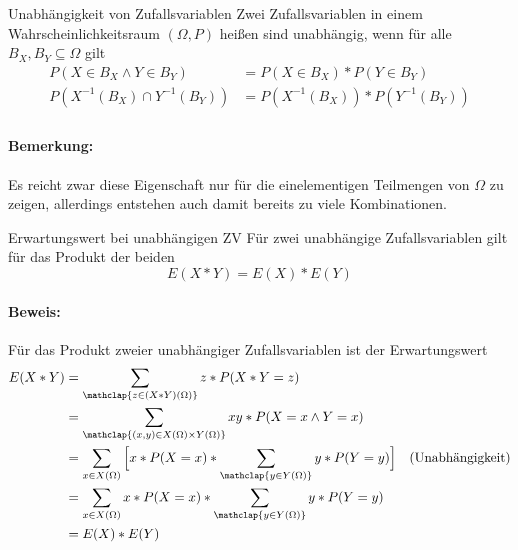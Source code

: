 \begin{definition}{Unabhängigkeit von Zufallsvariablen}
	Zwei Zufallsvariablen in einem Wahrscheinlichkeitsraum $(\Omega,P)$ heißen sind unabhängig, wenn 
	für alle $B_X,B_Y\subseteq \Omega$ gilt
	\begin{align*}
		P(X\in B_X\wedge Y\in B_Y)&=P(X\in B_X)*P(Y\in B_Y)\\
		P(X^{-1}(B_X)\cap Y^{-1}(B_Y))&=P(X^{-1}(B_X))*P(Y^{-1}(B_Y))\\
	\end{align*}
\end{definition}
\paragraph{Bemerkung:}
Es reicht zwar diese Eigenschaft nur für die einelementigen Teilmengen von $\Omega$ zu zeigen, allerdings entstehen auch damit bereits zu viele Kombinationen.


\begin{satz}{Erwartungswert bei unabhängigen ZV}
	Für zwei unabhängige Zufallsvariablen gilt für das Produkt der beiden
	\begin{equation*}
		E(X*Y)=E(X)*E(Y)
	\end{equation*}
\end{satz}
\paragraph{Beweis:}
Für das Produkt zweier unabhängiger Zufallsvariablen ist der Erwartungswert
\begin{align*}
	E(X*Y)&=\sum_{\mathclap{z\in(X*Y)(\Omega)}}z*P(X*Y=z)\\
	&=\sum_{\mathclap{(x,y)\in X(\Omega)\times Y(\Omega)}}xy*P(X=x \wedge Y=x)\\
	&=\sum_{x\in X(\Omega)}\Big[x*P(X=x) * \sum_{\mathclap{y\in Y(\Omega)}} y*P(Y=y)\Big] &\text{(Unabhängigkeit)}\\
	&=\sum_{x\in X(\Omega)}x*P(X=x)* \sum_{\mathclap{y\in Y(\Omega)}} y*P(Y=y)\\
	&=E(X)*E(Y)
\end{align*}


